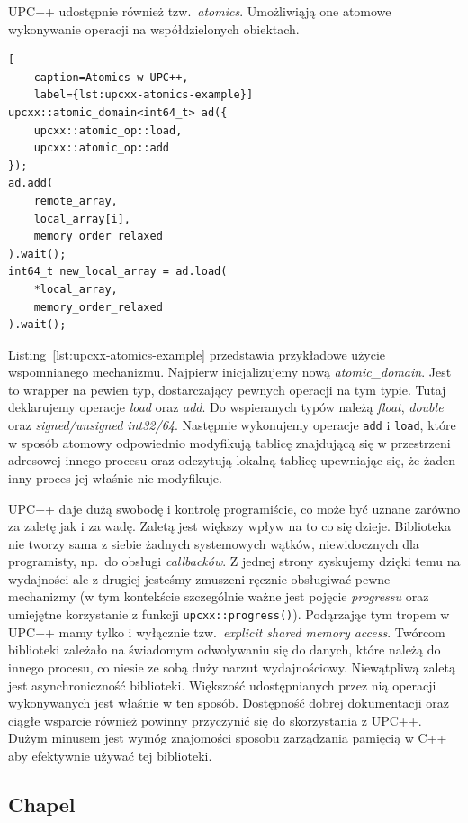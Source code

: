 \documentclass[twocolumn]{article}
\begin{document}
UPC++ udostępnie również tzw.\ \textit{atomics}.
Umożliwiąją one atomowe wykonywanie operacji na
współdzielonych obiektach.
\begin{lstlisting}[
    caption=Atomics w UPC++,
    label={lst:upcxx-atomics-example}]
upcxx::atomic_domain<int64_t> ad({
    upcxx::atomic_op::load,
    upcxx::atomic_op::add
});
ad.add(
    remote_array,
    local_array[i],
    memory_order_relaxed
).wait();
int64_t new_local_array = ad.load(
    *local_array,
    memory_order_relaxed
).wait();
\end{lstlisting}
Listing~\ref{lst:upcxx-atomics-example} przedstawia przykładowe użycie wspomnianego mechanizmu.
Najpierw inicjalizujemy nową \textit{atomic\_domain}.
Jest to wrapper na pewien typ, dostarczający pewnych operacji na tym typie.
Tutaj deklarujemy operacje \textit{load} oraz \textit{add}.
Do wspieranych typów należą \textit{float}, \textit{double} oraz \textit{signed/unsigned int32/64}.
Następnie wykonujemy operacje \texttt{add} i \texttt{load}, które w sposób atomowy odpowiednio
modyfikują tablicę znajdującą się w przestrzeni adresowej innego procesu oraz odczytują lokalną
tablicę upewniając się, że żaden inny proces jej właśnie nie modyfikuje.

UPC++ daje dużą swobodę i kontrolę programiście, co może być uznane
zarówno za zaletę jak i za wadę.
Zaletą jest większy wpływ na to co się dzieje.
Biblioteka nie tworzy sama z siebie żadnych
systemowych wątków, niewidocznych dla programisty, np.\ do obsługi
\textit{callbacków}.
Z jednej strony zyskujemy dzięki temu na wydajności
ale z drugiej jesteśmy zmuszeni ręcznie obsługiwać pewne mechanizmy
(w tym kontekście szczególnie ważne jest pojęcie \textit{progressu} oraz
umiejętne korzystanie z funkcji \texttt{upcxx::progress()}).
Podąrzając tym
tropem w UPC++ mamy tylko i wyłącznie tzw.\ \textit{explicit shared memory access}.
Twórcom biblioteki zależało na świadomym odwoływaniu się do danych, które należą do
innego procesu, co niesie ze sobą duży narzut wydajnościowy.
Niewątpliwą zaletą jest asynchroniczność biblioteki.
Większość udostępnianych
przez nią operacji wykonywanych jest właśnie w ten sposób.
Dostępność dobrej dokumentacji oraz ciągłe wsparcie również powinny
przyczynić się do skorzystania z UPC++.
Dużym minusem jest wymóg znajomości sposobu zarządzania pamięcią
w C++ aby efektywnie używać tej biblioteki.

\subsection{Chapel}
\end{document}
